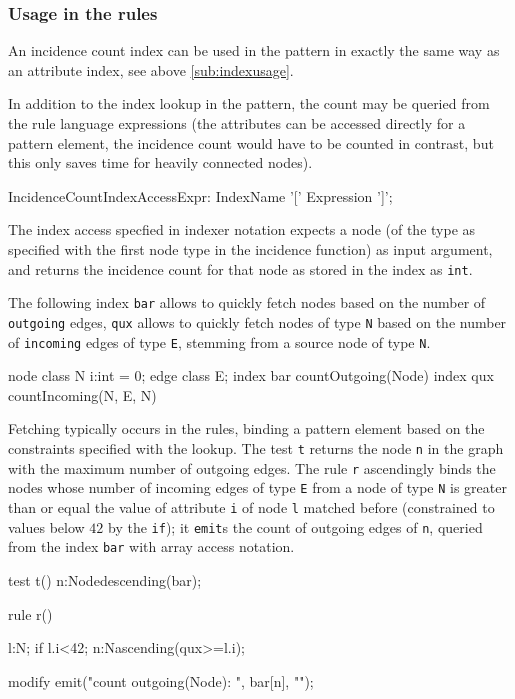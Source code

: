 \subsubsection*{Usage in the rules}
An incidence count index can be used in the pattern in exactly the same way as an attribute index, see above \ref{sub:indexusage}.

In addition to the index lookup in the pattern, 
the count may be queried from the rule language expressions (the attributes can be accessed directly for a pattern element, the incidence count would have to be counted in contrast, but this only saves time for heavily connected nodes).

\begin{rail}
  IncidenceCountIndexAccessExpr:
    IndexName '[' Expression ']';
\end{rail}

The index access specfied in indexer notation expects a node (of the type as specified with the first node type in the incidence function) as input argument, and returns the incidence count for that node as stored in the index as \texttt{int}.

\begin{example}
The following index \texttt{bar} allows to quickly fetch nodes based on the number of \texttt{outgoing} edges, \texttt{qux} allows to quickly fetch nodes of type \texttt{N} based on the number of \texttt{incoming} edges of type \texttt{E}, stemming from a source node of type \texttt{N}.

\begin{grgen}
node class N {
	i:int = 0;
}
edge class E;
index bar { countOutgoing(Node) }
index qux { countIncoming(N, E, N) }
\end{grgen}

Fetching typically occurs in the rules, binding a pattern element based on the constraints specified with the lookup.
The test \texttt{t} returns the node \texttt{n} in the graph with the maximum number of outgoing edges.
The rule \texttt{r} ascendingly binds the nodes whose number of incoming edges of type \texttt{E} from a node of type \texttt{N} is greater than or equal the value of attribute \texttt{i} of node \texttt{l} matched before (constrained to values below $42$ by the \texttt{if}); it \texttt{emit}s the count of outgoing edges of \texttt{n}, queried from the index \texttt{bar} with array access notation.

\begin{grgen}
test t() {
	n:Node{descending(bar)};
}

rule r() {
  l:N; if{ l.i<42;}
  n:N{ascending(qux>=l.i)};
	
  modify {
    emit("count outgoing(Node): ", bar[n], "\n");
  }
}
\end{grgen}

\end{example}

